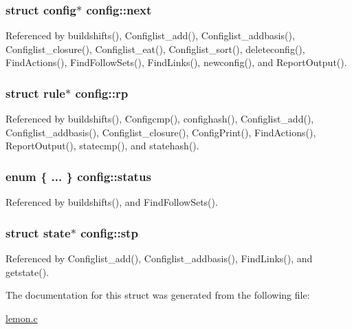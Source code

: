 \hypertarget{structconfig_a80193cbd04fe719812dc0afb71a33664}{
\subsubsection[{next}]{\setlength{\rightskip}{0pt plus 5cm}struct {\bf config}$\ast$ config\-::next}}\label{structconfig_a80193cbd04fe719812dc0afb71a33664}


Referenced by buildshifts(), Configlist\-\_\-add(), Configlist\-\_\-addbasis(), Configlist\-\_\-closure(), Configlist\-\_\-eat(), Configlist\-\_\-sort(), deleteconfig(), Find\-Actions(), Find\-Follow\-Sets(), Find\-Links(), newconfig(), and Report\-Output().

\hypertarget{structconfig_a8e5c72aa9b4dbdfcda9cc9a33aa1ac59}{
\subsubsection[{rp}]{\setlength{\rightskip}{0pt plus 5cm}struct {\bf rule}$\ast$ config\-::rp}}\label{structconfig_a8e5c72aa9b4dbdfcda9cc9a33aa1ac59}


Referenced by buildshifts(), Configcmp(), confighash(), Configlist\-\_\-add(), Configlist\-\_\-addbasis(), Configlist\-\_\-closure(), Config\-Print(), Find\-Actions(), Report\-Output(), statecmp(), and statehash().

\hypertarget{structconfig_a51ab487668f5595d78e72ab9a78cbfb9}{
\subsubsection[{status}]{\setlength{\rightskip}{0pt plus 5cm}enum \{ ... \}   config\-::status}}\label{structconfig_a51ab487668f5595d78e72ab9a78cbfb9}


Referenced by buildshifts(), and Find\-Follow\-Sets().

\hypertarget{structconfig_a1a4d98b23408bb047054579dd46c70e2}{
\subsubsection[{stp}]{\setlength{\rightskip}{0pt plus 5cm}struct {\bf state}$\ast$ config\-::stp}}\label{structconfig_a1a4d98b23408bb047054579dd46c70e2}


Referenced by Configlist\-\_\-add(), Configlist\-\_\-addbasis(), Find\-Links(), and getstate().



The documentation for this struct was generated from the following file\-:\begin{DoxyCompactItemize}
\item 
\hyperlink{lemon_8c}{lemon.\-c}\end{DoxyCompactItemize}
